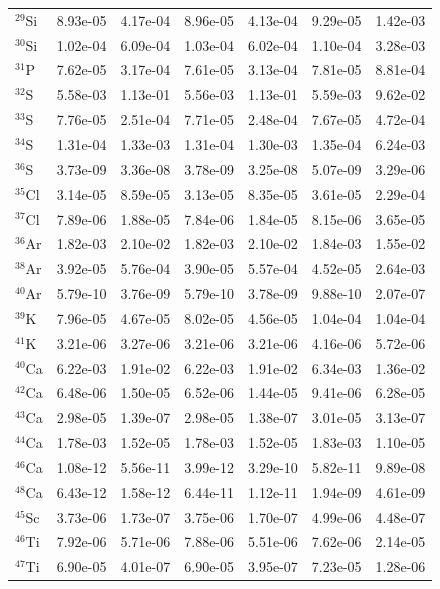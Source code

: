 \begin{table}
\begin{tabular}{l|cc|cc|cc}
$^{29}$Si & 8.93e-05 & 4.17e-04 & 8.96e-05 & 4.13e-04 & 9.29e-05 & 1.42e-03\\
$^{30}$Si & 1.02e-04 & 6.09e-04 & 1.03e-04 & 6.02e-04 & 1.10e-04 & 3.28e-03\\
$^{31}$P & 7.62e-05 & 3.17e-04 & 7.61e-05 & 3.13e-04 & 7.81e-05 & 8.81e-04\\
$^{32}$S & 5.58e-03 & 1.13e-01 & 5.56e-03 & 1.13e-01 & 5.59e-03 & 9.62e-02\\
$^{33}$S & 7.76e-05 & 2.51e-04 & 7.71e-05 & 2.48e-04 & 7.67e-05 & 4.72e-04\\
$^{34}$S & 1.31e-04 & 1.33e-03 & 1.31e-04 & 1.30e-03 & 1.35e-04 & 6.24e-03\\
$^{36}$S & 3.73e-09 & 3.36e-08 & 3.78e-09 & 3.25e-08 & 5.07e-09 & 3.29e-06\\
$^{35}$Cl & 3.14e-05 & 8.59e-05 & 3.13e-05 & 8.35e-05 & 3.61e-05 & 2.29e-04\\
$^{37}$Cl & 7.89e-06 & 1.88e-05 & 7.84e-06 & 1.84e-05 & 8.15e-06 & 3.65e-05\\
$^{36}$Ar & 1.82e-03 & 2.10e-02 & 1.82e-03 & 2.10e-02 & 1.84e-03 & 1.55e-02\\
$^{38}$Ar & 3.92e-05 & 5.76e-04 & 3.90e-05 & 5.57e-04 & 4.52e-05 & 2.64e-03\\
$^{40}$Ar & 5.79e-10 & 3.76e-09 & 5.79e-10 & 3.78e-09 & 9.88e-10 & 2.07e-07\\
$^{39}$K & 7.96e-05 & 4.67e-05 & 8.02e-05 & 4.56e-05 & 1.04e-04 & 1.04e-04\\
$^{41}$K & 3.21e-06 & 3.27e-06 & 3.21e-06 & 3.21e-06 & 4.16e-06 & 5.72e-06\\
$^{40}$Ca & 6.22e-03 & 1.91e-02 & 6.22e-03 & 1.91e-02 & 6.34e-03 & 1.36e-02\\
$^{42}$Ca & 6.48e-06 & 1.50e-05 & 6.52e-06 & 1.44e-05 & 9.41e-06 & 6.28e-05\\
$^{43}$Ca & 2.98e-05 & 1.39e-07 & 2.98e-05 & 1.38e-07 & 3.01e-05 & 3.13e-07\\
$^{44}$Ca & 1.78e-03 & 1.52e-05 & 1.78e-03 & 1.52e-05 & 1.83e-03 & 1.10e-05\\
$^{46}$Ca & 1.08e-12 & 5.56e-11 & 3.99e-12 & 3.29e-10 & 5.82e-11 & 9.89e-08\\
$^{48}$Ca & 6.43e-12 & 1.58e-12 & 6.44e-11 & 1.12e-11 & 1.94e-09 & 4.61e-09\\
$^{45}$Sc & 3.73e-06 & 1.73e-07 & 3.75e-06 & 1.70e-07 & 4.99e-06 & 4.48e-07\\
$^{46}$Ti & 7.92e-06 & 5.71e-06 & 7.88e-06 & 5.51e-06 & 7.62e-06 & 2.14e-05\\
$^{47}$Ti & 6.90e-05 & 4.01e-07 & 6.90e-05 & 3.95e-07 & 7.23e-05 & 1.28e-06\\

\end{tabular}
\end{table}
